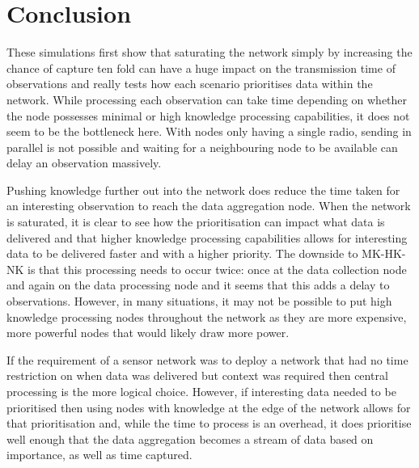 \section{Conclusion}\label{sim:conc}

These simulations first show that saturating the network simply by increasing the chance of capture ten fold can have a huge impact on the transmission time of observations and really tests how each scenario prioritises data within the network. While processing each observation can take time depending on whether the node possesses minimal or high knowledge processing capabilities, it does not seem to be the bottleneck here. With nodes only having a single radio, sending in parallel is not possible and waiting for a neighbouring node to be available can delay an observation massively.

Pushing knowledge further out into the network does reduce the time taken for an interesting observation to reach the data aggregation node. When the network is saturated, it is clear to see how the prioritisation can impact what data is delivered and that higher knowledge processing capabilities allows for interesting data to be delivered faster and with a higher priority. The downside to MK-HK-NK is that this processing needs to occur twice: once at the data collection node and again on the data processing node and it seems that this adds a delay to observations. However, in many situations, it may not be possible to put high knowledge processing nodes throughout the network as they are more expensive, more powerful nodes that would likely draw more power.

If the requirement of a sensor network was to deploy a network that had no time restriction on when data was delivered but context was required then central processing is the more logical choice. However, if interesting data needed to be prioritised then using nodes with knowledge at the edge of the network allows for that prioritisation and, while the time to process is an overhead, it does prioritise well enough that the data aggregation becomes a stream of data based on importance, as well as time captured.

	

